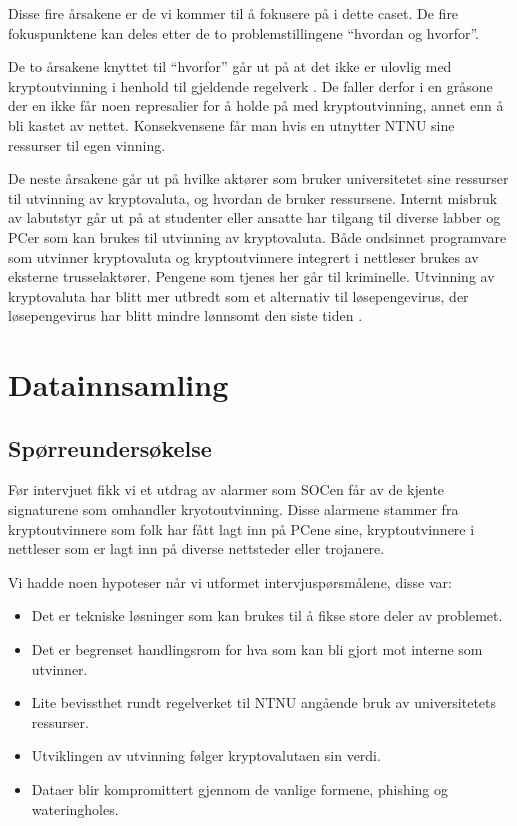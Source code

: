 Disse fire årsakene er de vi kommer til å fokusere på i dette caset. De fire fokuspunktene kan deles etter de to problemstillingene ``hvordan og hvorfor''.

De to årsakene knyttet til ``hvorfor'' går ut på at det ikke er ulovlig med kryptoutvinning i henhold til gjeldende regelverk \cite{ITReg}. De faller derfor i en gråsone der en ikke får noen represalier for å holde på med kryptoutvinning, annet enn å bli kastet av nettet. Konsekvensene får man hvis en utnytter NTNU sine ressurser til egen vinning.

De neste årsakene går ut på hvilke aktører som bruker universitetet sine ressurser til utvinning av kryptovaluta, og hvordan de bruker ressursene. Internt misbruk av labutstyr går ut på at studenter eller ansatte har tilgang til diverse labber og PCer som kan brukes til utvinning av kryptovaluta. Både ondsinnet programvare som utvinner kryptovaluta og kryptoutvinnere integrert i nettleser brukes av eksterne trusselaktører. Pengene som tjenes her går til kriminelle. Utvinning av kryptovaluta har blitt mer utbredt som et alternativ til løsepengevirus, der løsepengevirus har blitt mindre lønnsomt den siste tiden \cite{RW}.

\section{Datainnsamling}
\subsection{Spørreundersøkelse}
Før intervjuet fikk vi et utdrag av alarmer som SOCen får av de kjente signaturene som omhandler kryotoutvinning. Disse alarmene stammer fra kryptoutvinnere som folk har fått lagt inn på PCene sine, kryptoutvinnere i nettleser som er lagt inn på diverse nettsteder eller trojanere. 

Vi hadde noen hypoteser når vi utformet intervjuspørsmålene, disse var:
\begin{itemize}
    \item Det er tekniske løsninger som kan brukes til å fikse store deler av problemet.
    \item Det er begrenset handlingsrom for hva som kan bli gjort mot interne som utvinner.
    \item Lite bevissthet rundt regelverket til NTNU angående bruk av universitetets ressurser.
    \item Utviklingen av utvinning følger kryptovalutaen sin verdi.
    \item Dataer blir kompromittert gjennom de vanlige formene, phishing og wateringholes.
\end{itemize}

